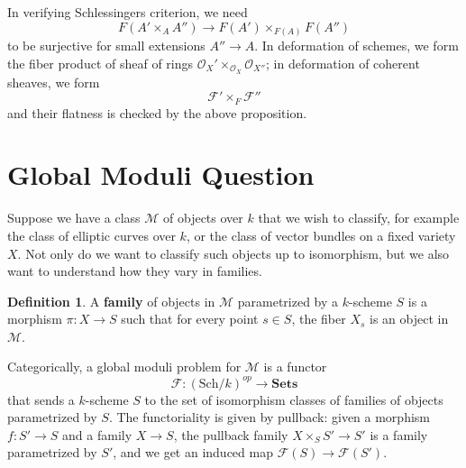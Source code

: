 \documentclass{article}
\theoremstyle{definition}
\theoremstyle{definition}
\newtheorem{definition}{Definition}[theorem]
\theoremstyle{definition}
\theoremstyle{definition}
\theoremstyle{definition}
\theoremstyle{definition}
\theoremstyle{definition}
\begin{document}
In verifying Schlessingers criterion, we need 
\[F(A'\times_A A'')\to F(A')\times_{F(A)}F(A'')\]
to be surjective for small extensions $A''\to A$. In deformation of schemes, we form the fiber product of sheaf of rings $\mathcal{O}_X'\times_{\mathcal{O}_X}\mathcal{O}_{X''}$; in deformation of coherent sheaves, we form 
\[\mathcal{F}'\times_{F}\mathcal{F}''\]
and their flatness is checked by the above proposition. 














\section{Global Moduli Question}
Suppose we have a class $\mathcal{M}$ of objects over $k$ that we wish to classify, for example the class of elliptic curves over $k$, or the class of vector bundles on a fixed variety $X$. Not only do we want to classify such objects up to isomorphism, but we also want to understand how they vary in families. 

\begin{definition}
	A \textbf{family} of objects in $\mathcal{M}$ parametrized by a $k$-scheme $S$ is a morphism $\pi: X\to S$ such that for every point $s\in S$, the fiber $X_s$ is an object in $\mathcal{M}$.
\end{definition}
Categorically, a global moduli problem for $\mathcal{M}$ is a functor
\[\mathcal{F}: (\textrm{Sch}/k)^{op}\to \textbf{Sets}\]
that sends a $k$-scheme $S$ to the set of isomorphism classes of families of objects parametrized by $S$. The functoriality is given by pullback: given a morphism $f: S'\to S$ and a family $X\to S$, the pullback family $X\times_S S'\to S'$ is a family parametrized by $S'$, and we get an induced map $\mathcal{F}(S)\to \mathcal{F}(S')$.
\end{document}
